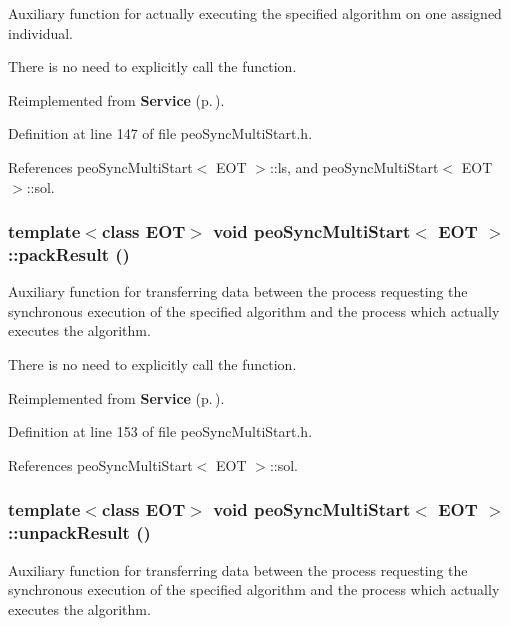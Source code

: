 Auxiliary function for actually executing the specified algorithm on one assigned individual. 

There is no need to explicitly call the function. 

Reimplemented from {\bf Service} {\rm (p.\,\pageref{class_service_e4f2894e6121e60f38d41cfbd7447ae4})}.

Definition at line 147 of file peo\-Sync\-Multi\-Start.h.

References peo\-Sync\-Multi\-Start$<$ EOT $>$::ls, and peo\-Sync\-Multi\-Start$<$ EOT $>$::sol.
\subsubsection{\setlength{\rightskip}{0pt plus 5cm}template$<$class EOT$>$ void {\bf peo\-Sync\-Multi\-Start}$<$ EOT $>$::pack\-Result ()\hspace{0.3cm}{\tt  [virtual]}}\label{classpeo_sync_multi_start_6c48eb0dae741cff7203b65e226f9616}


Auxiliary function for transferring data between the process requesting the synchronous execution of the specified algorithm and the process which actually executes the algorithm. 

There is no need to explicitly call the function. 

Reimplemented from {\bf Service} {\rm (p.\,\pageref{class_service_e5e4f90b2315e15c2a2913bd370f4cf5})}.

Definition at line 153 of file peo\-Sync\-Multi\-Start.h.

References peo\-Sync\-Multi\-Start$<$ EOT $>$::sol.
\subsubsection{\setlength{\rightskip}{0pt plus 5cm}template$<$class EOT$>$ void {\bf peo\-Sync\-Multi\-Start}$<$ EOT $>$::unpack\-Result ()\hspace{0.3cm}{\tt  [virtual]}}\label{classpeo_sync_multi_start_c3cbd1f10a89d1915c5ccf82a2c34a1d}


Auxiliary function for transferring data between the process requesting the synchronous execution of the specified algorithm and the process which actually executes the algorithm. 

